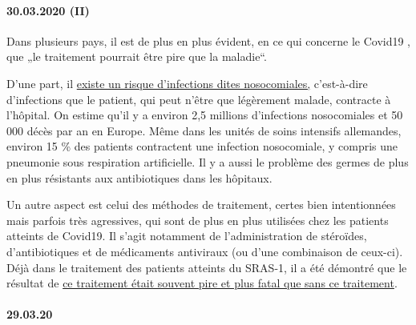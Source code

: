 \hypertarget{30032020-ii}{%
\paragraph{30.03.2020 (II)}\label{30032020-ii}}

Dans plusieurs pays, il est de plus en plus évident, en ce qui concerne
le Covid19 , que „le traitement pourrait être pire que la maladie``.

D'une part, il
\href{https://en.wikipedia.org/wiki/Hospital-acquired_infection}{existe
un risque d'infections dites nosocomiales,} c'est-à-dire d'infections
que le patient, qui peut n'être que légèrement malade, contracte à
l'hôpital. On estime qu'il y a environ 2,5 millions d'infections
nosocomiales et 50 000 décès par an en Europe. Même dans les unités de
soins intensifs allemandes, environ 15 \% des patients contractent une
infection nosocomiale, y compris une pneumonie sous respiration
artificielle. Il y a aussi le problème des germes de plus en plus
résistants aux antibiotiques dans les hôpitaux.

Un autre aspect est celui des méthodes de traitement, certes bien
intentionnées mais parfois très agressives, qui sont de plus en plus
utilisées chez les patients atteints de Covid19. Il s'agit notamment de
l'administration de stéroïdes, d'antibiotiques et de médicaments
antiviraux (ou d'une combinaison de ceux-ci). Déjà dans le traitement
des patients atteints du SRAS-1, il a été démontré que le résultat de
\href{https://www.sciencedaily.com/releases/2020/02/200206110703.htm}{ce
traitement était souvent pire et plus fatal que sans ce traitement}.

\hypertarget{290320}{%
\paragraph{29.03.20}\label{290320}}

